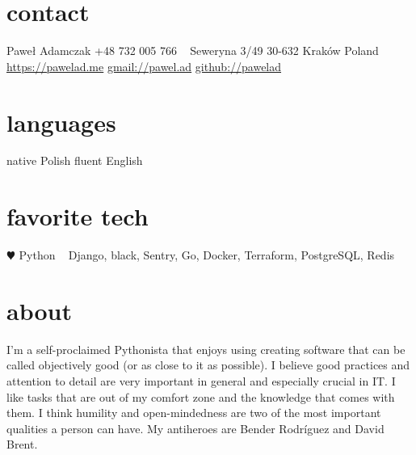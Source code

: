 \documentclass[]{cv-style}          %
\begin{document}
\lastupdated


\begin{aside}
%
\section{contact}
Paweł Adamczak
+48 732 005 766
~
Seweryna 3/49
30-632 Kraków
Poland
~
\href{https://pawelad.me/}{https://pawelad.me}
\href{mailto:pawel.ad@gmail.com}{gmail://pawel.ad}
\href{https://www.github.com/pawelad}{github://pawelad}
%
\section{languages}
native Polish
fluent English
%
\section{favorite tech}
{\color{red} $\varheartsuit$} Python
~
Django, black, Sentry, Go, Docker, Terraform, PostgreSQL, Redis
\end{aside}


\section{about}
  \vspace{-0.2cm}

I'm a self-proclaimed Pythonista that enjoys using  creating software that can be called objectively good (or as close to it as possible). I believe good practices and attention to detail are very important in general and especially crucial in IT. I like tasks that are out of my comfort zone and the knowledge that comes with them. I think humility and open-mindedness are two of the most important qualities a person can have. My antiheroes are Bender Rodríguez and David Brent.

\end{document}

